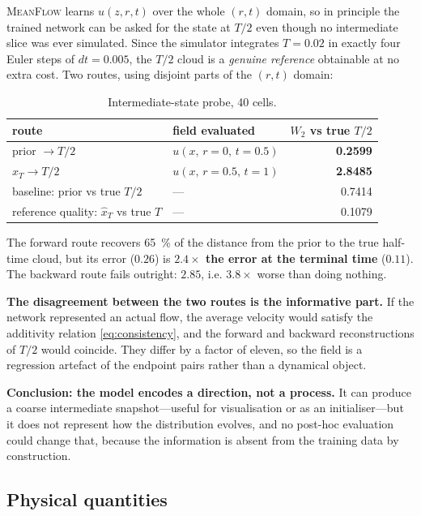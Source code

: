 ﻿\documentclass[11pt,a4paper]{article}
\newcommand{\Wtwo}{W_2}
\newcommand{\mf}{\textsc{MeanFlow}}
\begin{document}
\mf{} learns $u(z,r,t)$ over the whole $(r,t)$ domain, so in principle the trained network can
be asked for the state at $T/2$ even though no intermediate slice was ever simulated. Since the
simulator integrates $T=0.02$ in exactly four Euler steps of $dt=0.005$, the $T/2$ cloud is a
\emph{genuine reference} obtainable at no extra cost. Two routes, using disjoint parts of the
$(r,t)$ domain:

\begin{table}[h]
\centering\small
\begin{tabular}{@{}llr@{}}
\toprule
route & field evaluated & $\Wtwo$ vs true $T/2$ \\
\midrule
prior $\to T/2$ & $u(x,\,r{=}0,\,t{=}0.5)$ & \textbf{0.2599} \\
$\hat x_T\to T/2$ & $u(x,\,r{=}0.5,\,t{=}1)$ & \textbf{2.8485} \\
baseline: prior vs true $T/2$ & --- & 0.7414 \\
reference quality: $\hat x_T$ vs true $T$ & --- & 0.1079 \\
\bottomrule
\end{tabular}
\caption{Intermediate-state probe, 40 cells.}
\end{table}

The forward route recovers \SI{65}{\percent} of the distance from the prior to the true
half-time cloud, but its error ($0.26$) is \textbf{$2.4\times$ the error at the terminal time}
($0.11$). The backward route fails outright: $2.85$, i.e. $3.8\times$ worse than doing nothing.

\textbf{The disagreement between the two routes is the informative part.} If the network
represented an actual flow, the average velocity would satisfy the additivity relation
\eqref{eq:consistency}, and the forward and backward reconstructions of $T/2$ would coincide.
They differ by a factor of eleven, so the field is a regression artefact of the endpoint pairs
rather than a dynamical object.

\textbf{Conclusion: the model encodes a direction, not a process.} It can produce a coarse
intermediate snapshot---useful for visualisation or as an initialiser---but it does not represent
how the distribution evolves, and no post-hoc evaluation could change that, because the
information is absent from the training data by construction.

\subsection{Physical quantities}
\end{document}
